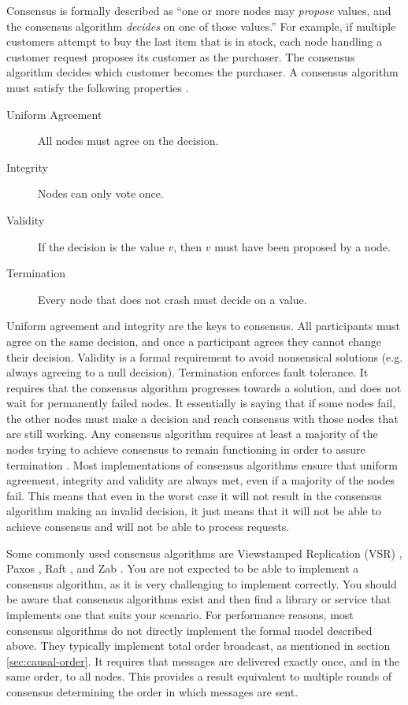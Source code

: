 Consensus is formally described as ``one or more nodes may \emph{propose} values,
and the consensus algorithm \emph{decides} on one of those values.''
For example, if multiple customers attempt to buy the last item that is in stock,
each node handling a customer request proposes its customer as the purchaser.
The consensus algorithm decides which customer becomes the purchaser.
A consensus algorithm must satisfy the following properties \cite{cachin2011Distributed}.

\begin{description}
    \item[Uniform Agreement] All nodes must agree on the decision.
    \item[Integrity] Nodes can only vote once.
    \item[Validity] If the decision is the value $v$, then $v$ must have been proposed by a node.
    \item[Termination] Every node that does not crash must decide on a value.
\end{description}

Uniform agreement and integrity are the keys to consensus.
All participants must agree on the same decision, and once a participant agrees they cannot change their decision.
Validity is a formal requirement to avoid nonsensical solutions (e.g. always agreeing to a null decision).
Termination enforces fault tolerance.
It requires that the consensus algorithm progresses towards a solution, and does not wait for permanently failed nodes.
It essentially is saying that if some nodes fail,
the other nodes must make a decision and reach consensus with those nodes that are still working.
Any consensus algorithm requires at least a majority of the nodes trying to achieve consensus
to remain functioning in order to assure termination \cite{chandra1996reliable}.
Most implementations of consensus algorithms ensure that uniform agreement, integrity and validity are always met, 
even if a majority of the nodes fail.
This means that even in the worst case it will not result in the consensus algorithm making an invalid decision,
it just means that it will not be able to achieve consensus and will not be able to process requests.

Some commonly used consensus algorithms are Viewstamped Replication (VSR) \cite{vsr1988},
Paxos \cite{paxos1998}, Raft \cite{raft2015}, and Zab \cite{zab2011}.
You are not expected to be able to implement a consensus algorithm, as it is very challenging to implement correctly.
You should be aware that consensus algorithms exist and then find a library or service that implements one that suits your scenario.
For performance reasons, most consensus algorithms do not directly implement the formal model described above.
They typically implement total order broadcast, as mentioned in section \ref{sec:causal-order}.
It requires that messages are delivered exactly once, and in the same order, to all nodes.
This provides a result equivalent to multiple rounds of consensus determining the order in which messages are sent.

